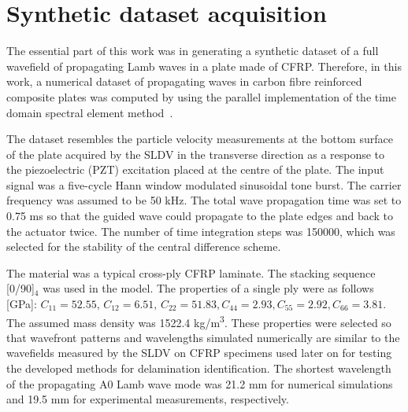 \section{Synthetic dataset acquisition}
\label{sec41}
The essential part of this work was in generating a synthetic dataset of a full wavefield of propagating Lamb waves in a plate made of CFRP.
Therefore, in this work, a numerical dataset of propagating waves in carbon fibre reinforced composite plates was computed by using the parallel implementation of the time domain spectral element method~\cite{Kudela2020}.

The dataset resembles the particle velocity measurements at the bottom surface of the plate acquired by the SLDV in the transverse direction as a response to the piezoelectric (PZT) excitation placed at the centre of the plate. 
The input signal was a five-cycle Hann window modulated sinusoidal tone burst. 
The carrier frequency was assumed to be 50 kHz. 
The total wave propagation time was set to 0.75 ms so that the guided wave could propagate to the plate edges and back to the actuator twice.
The number of time integration steps was 150000, which was selected for the stability of the central difference scheme.

The material was a typical cross-ply CFRP laminate. 
The stacking sequence [0/90]\(_4\) was used in the model. 
The properties of a single ply were as follows [GPa]:
\(C_{11} = 52.55, \, C_{12} = 6.51, \, C_{22} = 51.83, C_{44} = 2.93, C_{55} = 2.92, C_{66} = 3.81\). 
The assumed mass density was 1522.4 kg/m\textsuperscript{3}.
These properties were selected so that wavefront patterns and wavelengths simulated numerically are similar to the wavefields measured by the SLDV on CFRP specimens used later on for testing the developed methods for delamination identification.
The shortest wavelength of the propagating A0 Lamb wave mode was 21.2 mm for numerical simulations and 19.5 mm for experimental measurements, respectively.

